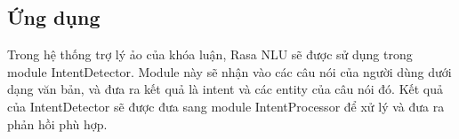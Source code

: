 \subsection{Ứng dụng}

Trong hệ thống trợ lý ảo của khóa luận, Rasa NLU sẽ được sử dụng trong module IntentDetector. Module này sẽ nhận vào các câu nói của người dùng dưới dạng văn bản, và đưa ra kết quả là intent và các entity của câu nói đó. Kết quả của IntentDetector sẽ được đưa sang module IntentProcessor để xử lý và đưa ra phản hồi phù hợp.
